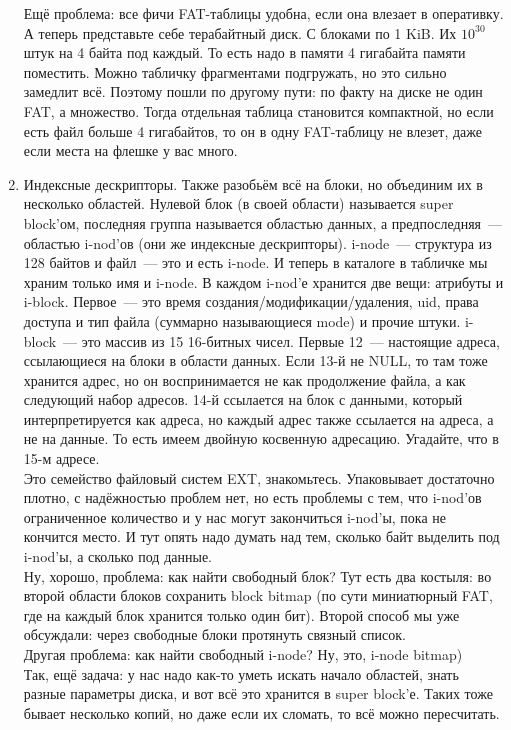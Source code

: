 \documentclass{article}
\begin{document}
\begin{enumerate}
        Ещё проблема: все фичи FAT-таблицы удобна, если она влезает в оперативку. А теперь представьте себе терабайтный диск. С блоками по 1 KiB. Их $10^{30}$ штук на 4 байта под каждый. То есть надо в памяти 4 гигабайта памяти поместить. Можно табличку фрагментами подгружать, но это сильно замедлит всё. Поэтому пошли по другому пути: по факту на диске не один FAT, а множество. Тогда отдельная таблица становится компактной, но если есть файл больше 4 гигабайтов, то он в одну FAT-таблицу не влезет, даже если места на флешке у вас много.
        \item Индексные дескрипторы. Также разобьём всё на блоки, но объединим их в несколько областей. Нулевой блок (в своей области) называется super block'ом, последняя группа называется областью данных, а предпоследняя~--- областью i-nod'ов (они же индексные дескрипторы). i-node~--- структура из 128 байтов и файл~--- это и есть i-node. И теперь в каталоге в табличке мы храним только имя и i-node. В каждом i-nod'е хранится две вещи: атрибуты и i-block. Первое~--- это время создания/модификации/удаления, uid, права доступа и тип файла (суммарно называющиеся mode) и прочие штуки. i-block~--- это массив из 15 16-битных чисел. Первые 12~--- настоящие адреса, ссылающиеся на блоки в области данных. Если 13-й не NULL, то там тоже хранится адрес, но он воспринимается не как продолжение файла, а как следующий набор адресов. 14-й ссылается на блок с данными, который интерпретируется как адреса, но каждый адрес также ссылается на адреса, а не на данные. То есть имеем двойную косвенную адресацию. Угадайте, что в 15-м адресе.\\
        Это семейство файловый систем EXT, знакомьтесь. Упаковывает достаточно плотно, с надёжностью проблем нет, но есть проблемы с тем, что i-nod'ов ограниченное количество и у нас могут закончиться i-nod'ы, пока не кончится место. И тут опять надо думать над тем, сколько байт выделить под i-nod'ы, а сколько под данные.\\
        Ну, хорошо, проблема: как найти свободный блок? Тут есть два костыля: во второй области блоков сохранить block bitmap (по сути миниатюрный FAT, где на каждый блок хранится только один бит). Второй способ мы уже обсуждали: через свободные блоки протянуть связный список.\\
        Другая проблема: как найти свободный i-node? Ну, это, i-node bitmap)\\
        Так, ещё задача: у нас надо как-то уметь искать начало областей, знать разные параметры диска, и вот всё это хранится в super block'е. Таких тоже бывает несколько копий, но даже если их сломать, то всё можно пересчитать.\\

\end{enumerate}
\end{document}
